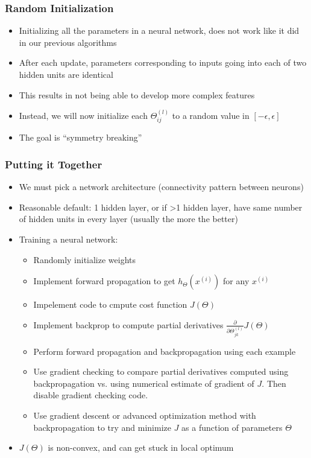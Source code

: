 \subsubsection{Random Initialization}
\begin{itemize}[--]
	\item Initializing all the parameters in a neural network, does not work like it did in our previous algorithms
	\item After each update, parameters corresponding to inputs going into each of two hidden units are identical
	\item This results in not being able to develop more complex features
	\item Instead, we will now initialize each $\Theta_{ij}^{(l)}$ to a random value in $\left[ -\epsilon, \epsilon \right]$
	\item The goal is ``symmetry breaking''
\end{itemize}

\subsubsection{Putting it Together}
\begin{itemize}[--]
	\item We must pick a network architecture (connectivity pattern between neurons)
	\item Reasonable default: 1 hidden layer, or if >1 hidden layer, have same number of hidden units in every layer (usually the more the better)
	\item Training a neural network:
	\begin{itemize}[--]
		\item Randomly initialize weights
		\item Implement forward propagation to get $h_{\Theta} (x^{(i)})$ for any $x^{(i)}$
		\item Impelement code to cmpute cost function $J(\Theta)$
		\item Implement backprop to compute partial derivatives $\frac{\partial}{\partial \Theta_{jk}^{(l)}} J(\Theta)$
		\item Perform forward propagation and backpropagation using each example
		\item Use gradient checking to compare partial derivatives computed using backpropagation vs. using numerical estimate of gradient of $J$. Then disable gradient checking code.
		\item Use gradient descent or advanced optimization method with backpropagation to try and minimize $J$ as a function of parameters $\Theta$
	\end{itemize}

	\item $J(\Theta )$ is non-convex, and can get stuck in local optimum
	
\end{itemize}